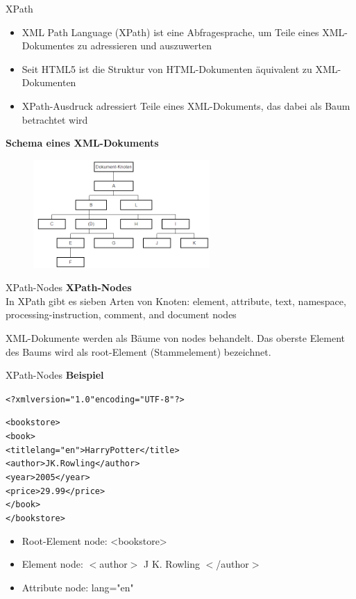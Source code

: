 \documentclass[xcolor=dvipsnames]{beamer}\usepackage[]{graphicx}\usepackage[]{color}
\makeatletter
\newcommand{\hlstr}[1]{\textcolor[rgb]{0.192,0.494,0.8}{#1}}%
\newenvironment{kframe}{%
 \def\at@end@of@kframe{}%
 \ifinner\ifhmode%
  \def\at@end@of@kframe{\end{minipage}}%
  \begin{minipage}{\columnwidth}%
 \fi\fi%
 \def\FrameCommand##1{\hskip\@totalleftmargin \hskip-\fboxsep
 \colorbox{shadecolor}{##1}\hskip-\fboxsep
     \hskip-\linewidth \hskip-\@totalleftmargin \hskip\columnwidth}%
 \MakeFramed {\advance\hsize-\width
   \@totalleftmargin\z@ \linewidth\hsize
   \@setminipage}}%
 {\par\unskip\endMakeFramed%
 \at@end@of@kframe}
\makeatother
\begin{document}
\begin{frame}{XPath}
\begin{itemize}
\item XML Path Language (XPath) ist eine Abfragesprache, um Teile eines XML-Dokumentes zu adressieren und auszuwerten
\item Seit HTML5 ist die Struktur von HTML-Dokumenten äquivalent zu XML-Dokumenten
\item XPath-Ausdruck adressiert Teile eines XML-Dokuments, das dabei als Baum betrachtet wird
\end{itemize}
\textbf{Schema eines XML-Dokuments}
  \begin{figure}
	\centering
	\includegraphics[width=0.6\textwidth]{figure/XML-Structure.png}
  \end{figure}
\end{frame}


\begin{frame}{XPath-Nodes}
\textbf{XPath-Nodes}\\
In XPath gibt es sieben Arten von Knoten: element, attribute, text, namespace, processing-instruction, comment, and document nodes

XML-Dokumente werden als Bäume von nodes behandelt. Das oberste Element des Baums wird als root-Element (Stammelement) bezeichnet.
\end{frame}


\begin{frame}[fragile]{XPath-Nodes}
\textbf{Beispiel}
\begin{kframe}
\begin{alltt}
<?xml version=\hlstr{"1.0"} encoding=\hlstr{"UTF-8"}?>

<bookstore>
  <book>
    <title lang=\hlstr{"en"}>Harry Potter</title>
    <author>J K. Rowling</author>
    <year>2005</year>
    <price>29.99</price>
  </book>
</bookstore>
\end{alltt}
\end{kframe}
  \begin{itemize}
    \item Root-Element node: <bookstore>
    \item Element node: $<$author$>$ J K. Rowling $<$/author$>$
    \item Attribute node: lang="en" 
  \end{itemize}
\end{frame}
\end{document}
